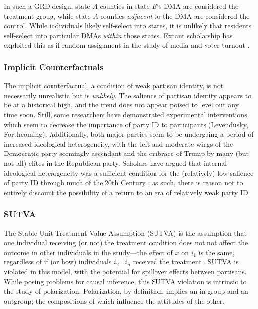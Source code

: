\documentclass[12pt]{article}
\begin{document}
In such a GRD design, state $A$ counties in state $B$'s DMA are considered the treatment group, while state $A$ counties \textit{adjacent} to the DMA are considered the control. While individuals likely self-select into states, it is unlikely that residents self-select into particular DMAs \textit{within} those states. Extant scholarship has exploited this as-if random assignment in the study of media and voter turnout \cite{krasno2008televised, huber2007identifying}.








\subsubsection{Implicit Counterfactuals}
The implicit counterfactual, a condition of weak partisan identity, is not necessarily unrealistic but is \textit{unlikely}. The salience of partisan identity appears to be at a historical high, and the trend does not appear poised to level out any time soon. Still, some researchers have demonstrated experimental interventions which seem to decrease the importance of party ID to participants (Levendusky, Forthcoming). Additionally, both major parties seem to be undergoing a period of increased ideological heterogeneity, with the left and moderate wings of the Democratic party seemingly ascendant and the embrace of Trump by many (but not all) elites in the Republican party. Scholars have argued that internal ideological heterogeneity was a sufficient condition for the (relatively) low salience of party ID through much of the 20th Century \citep{rohde1991parties}; as such, there is reason not to entirely discount the possibility of a return to an era of relatively weak party ID.

\subsubsection{SUTVA}
The Stable Unit Treatment Value Assumption (SUTVA) is the assumption that one individual receiving (or not) the treatment condition does not not affect the outcome in other individuals in the study---the effect of $x$ on $i_1$ is the same, regardless of if (or how) individuals $i_2 \ldots i_n$ received the treatment \citep[p. 48]{morgan2015counterfactuals}. 
SUTVA is violated in this model, with the potential for spillover effects between partisans. While posing problems for causal inference, this SUTVA violation is intrinsic to the study of polarization. Polarization, by definition, implies an in-group and an outgroup; the compositions of which influence the attitudes of the other. 
\end{document}
